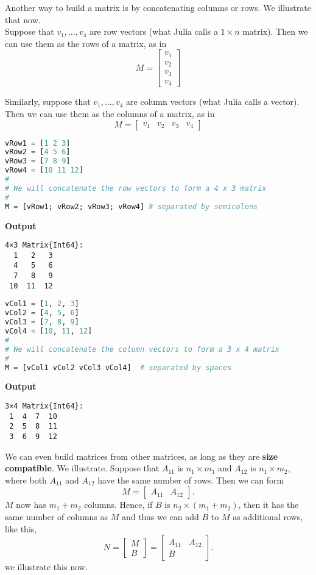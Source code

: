 Another way to build a matrix is by concatenating columns or rows. We illustrate that now.\\

Suppose that $v_1, \ldots, v_4$ are row vectors (what Julia calls a $1 \times n$ matrix). Then we can use them as the rows of a matrix, as in 
$$ M = \begin{bmatrix}
v_1 \\
v_2 \\
v_3\\
v_4    
\end{bmatrix}
$$

Similarly, suppose that $v_1, \ldots, v_4$ are column vectors (what Julia calls a vector). Then we can use them as the columns of a matrix, as in 
$$ M = \begin{bmatrix}
v_1 & v_2 & v_3 & v_4    
\end{bmatrix}
$$

\begin{lstlisting}[language=Julia,style=mystyle]
vRow1 = [1 2 3]
vRow2 = [4 5 6]
vRow3 = [7 8 9]
vRow4 = [10 11 12]
#
# We will concatenate the row vectors to form a 4 x 3 matrix
#
M = [vRow1; vRow2; vRow3; vRow4] # separated by semicolons
\end{lstlisting}
\textbf{Output} 
\begin{verbatim}
4×3 Matrix{Int64}:
  1   2   3
  4   5   6
  7   8   9
 10  11  12
\end{verbatim}

\begin{lstlisting}[language=Julia,style=mystyle]
vCol1 = [1, 2, 3]
vCol2 = [4, 5, 6]
vCol3 = [7, 8, 9]
vCol4 = [10, 11, 12]
#
# We will concatenate the column vectors to form a 3 x 4 matrix
#
M = [vCol1 vCol2 vCol3 vCol4]  # separated by spaces
\end{lstlisting}
\textbf{Output} 
\begin{verbatim}
3×4 Matrix{Int64}:
 1  4  7  10
 2  5  8  11
 3  6  9  12
\end{verbatim}

We can even build matrices from other matrices, as long as they are \textbf{size compatible}. We illustrate. Suppose that $A_{11}$ is $n_1 \times m_1$ and $A_{12}$ is $n_1 \times m_2$, where both $A_{11}$ and $A_{12}$ have the same number of rows. Then we can form 
$$ M = \begin{bmatrix}
A_{11} & A_{12}   
\end{bmatrix}.
$$
$M$ now has $m_1 + m_2$ columns. Hence, if $B$ is $n_2 \times (m_1 + m_2)$, then it has the same number of columns as $M$ and thus we can add $B$ to $M$ as additional rows, like this,
$$ N = \begin{bmatrix}
M \\ B 
\end{bmatrix} = \left[ \begin{array}{c} A_{11} ~~~~ A_{12} \\ B  \end{array} \right].
$$
we illustrate this now.

